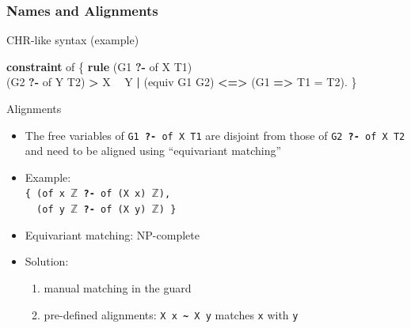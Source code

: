 \documentclass{beamer}
\begin{document}
\begin{frame}[fragile]
 \frametitle{Names and Alignments}
\begin{block}{CHR-like syntax (example)}
{\small \begin{semiverbatim}
\textbf{constraint} of \{
  \textbf{rule} (G1 \textbf{?-} of X T1) \textbf{\\} (G2 \textbf{?-} of Y T2) \textbf{>} X \textbf{~} Y
       \textbf{|} (equiv G1 G2) \textbf{<=>} (G1 \textbf{=>} T1 = T2).
\}
\end{semiverbatim}}
\end{block}

\begin{block}{Alignments}
 \begin{itemize}
  \item The \alert{free variables} of \texttt{G1 \textbf{?-} of X T1} are
    \alert{disjoint} from those of \texttt{G2 \textbf{?-} of X T2} and need
    to be \alert{aligned} using \alert{``equivariant matching''}
  \item Example:\\
   {\small \texttt{\{ (of x $\mathbb{Z}$ \textbf{?-} of (X x) $\mathbb{Z}$),\\~ (of y $\mathbb{Z}$ \textbf{?-} of (X y) $\mathbb{Z}$) \}}}
  \item \alert{Equivariant matching:} NP-complete
  \item Solution:
   \begin{enumerate}
    \item \alert{manual matching} in the guard
    \item pre-defined \alert{alignments}: \texttt{X x \textbf{\~} X y} matches
      \texttt{x} with \texttt{y}
   \end{enumerate}
    
 \end{itemize}
\end{block}
\end{frame}
\end{document}
